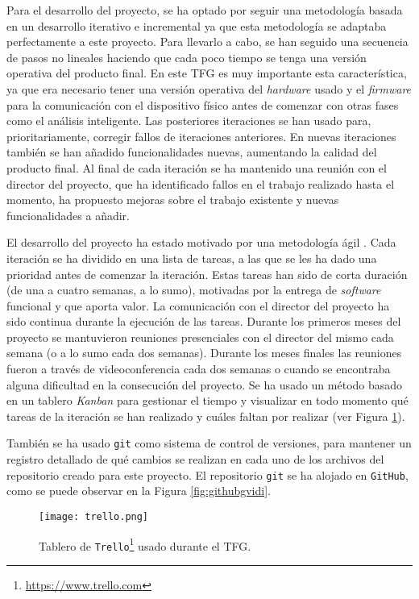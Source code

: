Para el desarrollo del proyecto, se ha optado por seguir una metodología basada en un desarrollo iterativo e incremental \cite{5} ya que esta metodología se adaptaba perfectamente a este proyecto. Para llevarlo a cabo, se han seguido una secuencia de pasos no lineales haciendo que cada poco tiempo se tenga una versión operativa del producto final. En este \ac{TFG} es muy importante esta característica, ya que era necesario tener una versión operativa del \textit{hardware} usado y el \textit{firmware} para la comunicación con el dispositivo físico antes de comenzar con otras fases como el análisis inteligente. Las posteriores iteraciones se han usado para, prioritariamente, corregir fallos de iteraciones anteriores. En nuevas iteraciones también se han añadido funcionalidades nuevas, aumentando la calidad del producto final. Al final de cada iteración se ha mantenido una reunión con el director del proyecto, que ha identificado fallos en el trabajo realizado hasta el momento, ha propuesto mejoras sobre el trabajo existente y nuevas funcionalidades a añadir.

El desarrollo del proyecto ha estado motivado por una metodología ágil \cite{6}. Cada iteración se ha dividido en una lista de tareas, a las que se les ha dado una prioridad antes de comenzar la iteración. Estas tareas han sido de corta duración (de una a cuatro semanas, a lo sumo), motivadas por la entrega de \textit{software} funcional y que aporta valor. La comunicación con el director del proyecto ha sido continua durante la ejecución de las tareas. Durante los primeros meses del proyecto se mantuvieron reuniones presenciales con el director del mismo cada semana (o a lo sumo cada dos semanas). Durante los meses finales las reuniones fueron a través de videoconferencia cada dos semanas o cuando se encontraba alguna dificultad en la consecución del proyecto. Se ha usado un método basado en un tablero \textit{Kanban} para gestionar el tiempo y visualizar en todo momento qué tareas de la iteración se han realizado y cuáles faltan por realizar (ver Figura \ref{fig:trello}).

También se ha usado \texttt{git} como sistema de control de versiones, para mantener un registro detallado de qué cambios se realizan en cada uno de los archivos del repositorio creado para este proyecto. El repositorio \texttt{git} se ha alojado en \texttt{GitHub}, como se puede observar en la Figura \ref{fig:githubgvidi}. 

\begin{figure}[!h]
\begin{center}
\texttt{[image: trello.png]}
\caption{Tablero de \texttt{Trello}\footnote{\url{https://www.trello.com}} usado durante el \ac{TFG}.}
\label{fig:trello}
\end{center}
\end{figure}

